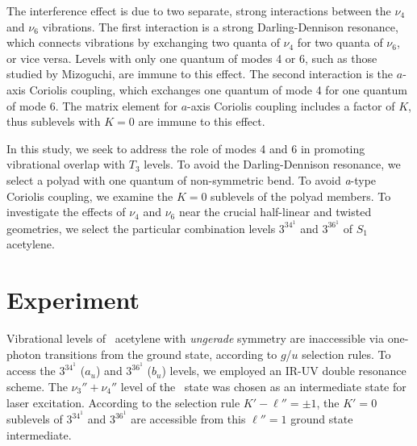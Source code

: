 The interference effect is due to two separate, strong interactions
between the $\nu_4$ and $\nu_6$ vibrations.  The first interaction is
a strong Darling-Dennison resonance, which connects vibrations by
exchanging two quanta of $\nu_4$ for two quanta of $\nu_6$, or vice
versa.  Levels with only one quantum of modes 4 or 6, such as those
studied by Mizoguchi, are immune to this effect.  The second
interaction is the $a$-axis Coriolis coupling, which exchanges one
quantum of mode 4 for one quantum of mode 6.  The matrix element for
$a$-axis Coriolis coupling includes a factor of $K$, thus sublevels
with $K=0$ are immune to this effect.

In this study, we seek to address the role of modes 4 and 6 in
promoting vibrational overlap with $T_3$ levels.  To avoid the
Darling-Dennison resonance, we select a polyad with one quantum of
non-symmetric bend.  To avoid \emph{a}-type Coriolis coupling, we examine
the $K=0$ sublevels of the polyad members.  To investigate the effects
of $\nu_4$ and $\nu_6$ near the crucial half-linear and twisted
geometries, we select the particular combination levels $3^34^1$ and
$3^36^1$ of $S_1$ acetylene.





























\section{Experiment}

Vibrational levels of \astate\ acetylene with \emph{ungerade}
symmetry are inaccessible via one-photon transitions from the ground
state, according to $g$/$u$ selection rules.  To access the $3^34^1$
($a_u$) and $3^36^1$ ($b_u$) levels, we employed an IR-UV double
resonance scheme.  The $\nu_3''+\nu_4''$ level of the \xstate\ state
was chosen as an intermediate state for laser excitation.  According
to the selection rule $K'-\ell'' = \pm 1$, the $K'=0$ sublevels of
$3^34^1$ and $3^36^1$ are accessible from this $\ell''=1$ ground state
intermediate.

